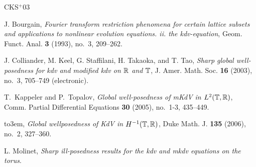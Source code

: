 \documentclass[12pt,reqno]{amsart}
\numberwithin{equation}{section}  %
\begin{document}
%
%
%
%
%
\newcommand{\etalchar}[1]{$^{#1}$}
\providecommand{\bysame}{\leavevmode\hbox to3em{\hrulefill}\thinspace}
\providecommand{\MR}{\relax\ifhmode\unskip\space\fi MR }
\providecommand{\MRhref}[2]{%
  \href{http://www.ams.org/mathscinet-getitem?mr=#1}{#2}
}
\providecommand{\href}[2]{#2}
\begin{thebibliography}{CKS{\etalchar{+}}03}

J. Bourgain, \emph{Fourier transform restriction phenomena for certain
  lattice subsets and applications to nonlinear evolution equations. ii. the
  kdv-equation}, Geom. Funct. Anal. \textbf{3} (1993), no.~3, 209--262.

\bibitem[CKS{\etalchar{+}}03]{Colliander:2003kx}
J. Colliander, M. Keel, G. Staffilani, H. Takaoka, and T. Tao, \emph{Sharp global
  well-posedness for kdv and modified kdv on {$\Bbb R$} and {$\Bbb T$}}, J.
  Amer. Math. Soc. \textbf{16} (2003), no.~3, 705--749 (electronic).

T.~Kappeler and P.~Topalov, \emph{Global well-posedness of m{K}d{V} in
  {$L^2(\Bbb T,\Bbb R)$}}, Comm. Partial Differential Equations \textbf{30}
  (2005), no.~1-3, 435--449.

\bysame, \emph{Global wellposedness of {K}d{V} in {$H^{-1}(\Bbb T,\Bbb R)$}},
  Duke Math. J. \textbf{135} (2006), no.~2, 327--360. 

L. Molinet, \emph{Sharp ill-posedness results for the kdv and mkdv equations
  on the torus}.

\end{thebibliography}        %
%
%
        
\end{document}
